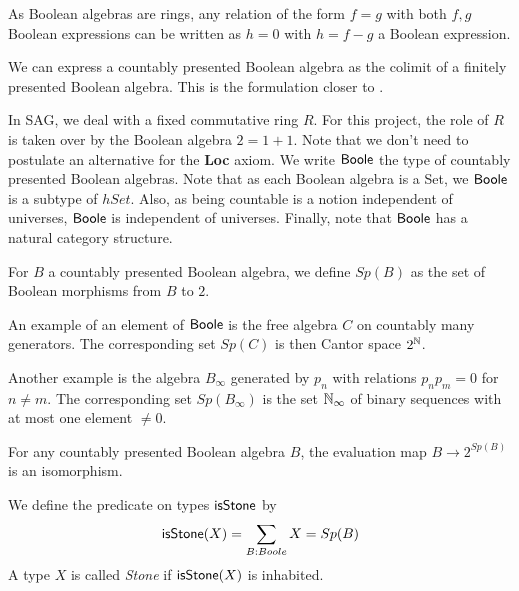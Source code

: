 \begin{remark}
  As Boolean algebras are rings, any relation of the form $f=g$ with both $f,g$ Boolean expressions 
  can be written as $h=0$ with $h=f-g$ a Boolean expression. 
\end{remark} 
We can express a countably presented Boolean algebra as the colimit of a finitely presented Boolean algebra. 
This is the formulation closer to \cite{Scholze}.



\medskip

In SAG, we deal with a fixed commutative ring $R$. For this project, the role of $R$ is taken over by 
the Boolean algebra $2 = 1+1$. Note that we don't need to postulate an alternative for the \textbf{Loc} axiom. 
We write $\mathsf{Boole}$ the type of countably presented Boolean algebras.
Note that as each Boolean algebra is a Set, we $\mathsf{Boole}$ is a subtype of $hSet$.
Also, as being countable is a notion independent of universes, $\mathsf{Boole}$ is independent of universes.
Finally, note that $\mathsf{Boole}$ has a natural category structure. 

\medskip

\begin{definition}
  For $B$ a countably presented Boolean algebra, we define $Sp(B)$ as the set of Boolean morphisms from $B$ to $2$. 
\end{definition}

\medskip

An example of an element of $\mathsf{Boole}$ is the free algebra $C$ on countably many generators. The corresponding set $Sp(C)$
is then Cantor space $2^{\mathbb{N}}$.

Another example is the algebra $B_{\infty}$ generated by $p_n$ with relations $p_np_m = 0$ for $n\neq m$. The corresponding
set $Sp(B_{\infty})$ is the set $\mathbb{N}_{\infty}$ of binary sequences with at most one element $\neq 0$.

\begin{axiomNum}
  For any countably presented Boolean algebra $B$, the evaluation map   $B\rightarrow  2^{Sp(B)}$ is an isomorphism.
\end{axiomNum} 

\begin{definition}
  We define the predicate on types $\mathsf{isStone}$ by 
  \begin{equation}
    \mathsf{isStone}(X) = \sum\limits_{B : Boole} X = Sp(B)
  \end{equation} 
  A type $X$ is called \textit{Stone} if $\mathsf{isStone}(X)$ is inhabited.
\end{definition}

